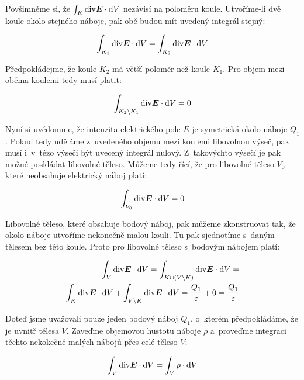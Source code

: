 Povšimněme si, že \(\int_{K} \mathrm{div} \boldsymbol{E} \cdot \mathrm{d}V\) nezávisí na poloměru koule. Utvoříme-li dvě koule okolo stejného náboje, pak obě budou mít uvedený integrál stejný:

\begin{equation}
\int_{K_1} \mathrm{div} \boldsymbol{E} \cdot \mathrm{d}V = \int_{K_2} \mathrm{div} \boldsymbol{E} \cdot \mathrm{d}V
\end{equation}

Předpokládejme, že koule \(K_2\) má větší poloměr než koule \(K_1\). Pro objem mezi oběma koulemi tedy musí platit:

\begin{equation}
\int_{K_2 \setminus K_1} \mathrm{div} \boldsymbol{E} \cdot \mathrm{d}V = 0
\end{equation}

Nyní si uvědomme, že intenzita elektrického pole \(E\) je symetrická okolo náboje \(Q_1\). Pokud tedy uděláme z~uvedeného objemu mezi koulemi libovolnou výseč, pak musí i~v~tézo výseči být uvecený integrál nulový. Z~takovýchto výsečí je pak možné poskládat libovolné těleso. Můžeme tedy řící, že pro libovolné těleso \(V_0\) které neobsahuje elektrický náboj platí:

\begin{equation}
\int_{V_0} \mathrm{div} \boldsymbol{E} \cdot \mathrm{d}V = 0
\end{equation}

Libovolné těleso, které obsahuje bodový náboj, pak můžeme zkonstruovat tak, že okolo náboje utvoříme nekonečně malou kouli. Tu pak sjednotíme s~daným tělesem bez této koule. Proto pro libovolné těleso s~bodovým nábojem platí:

\begin{equation}
\begin{split}
\int_{V} \mathrm{div} \boldsymbol{E} \cdot \mathrm{d}V = \int_{K \cup (V \setminus K)} \mathrm{div} \boldsymbol{E} \cdot \mathrm{d}V = \\
\int_{K} \mathrm{div} \boldsymbol{E} \cdot \mathrm{d}V + \int_{V \setminus K} \mathrm{div} \boldsymbol{E} \cdot \mathrm{d}V = \frac{Q_1}{\varepsilon} + 0 = \frac{Q_1}{\varepsilon}
\end{split}
\end{equation}

Doteď jsme uvažovali pouze jeden bodový náboj \(Q_1\), o~kterém předpokládáme, že je uvnitř tělesa \(V\). Zaveďme objemovou hustotu náboje \(\rho\) a~proveďme integraci těchto nekokečně malých nábojů přes celé těleso \(V\):

\begin{equation}
\int_{V} \mathrm{div} \boldsymbol{E} \cdot \mathrm{d}V = \int_{V} \rho \cdot \mathrm{d}V
\end{equation}

